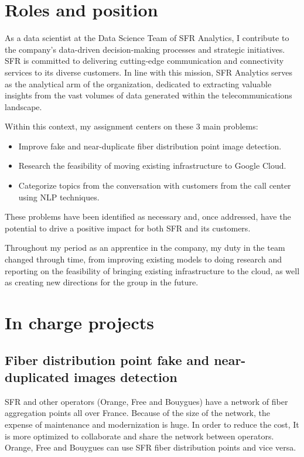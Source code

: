 \section{Roles and position}

As a data scientist at the Data Science Team of SFR Analytics, I contribute to the company's data-driven decision-making processes and strategic initiatives. SFR is committed to delivering cutting-edge communication and connectivity services to its diverse customers. In line with this mission, SFR Analytics serves as the analytical arm of the organization, dedicated to extracting valuable insights from the vast volumes of data generated within the telecommunications landscape.

Within this context, my assignment centers on these 3 main problems:

\begin{itemize}
    \item Improve fake and near-duplicate fiber distribution point image detection.
    \item Research the feasibility of moving existing infrastructure to Google Cloud.
    \item Categorize topics from the conversation with customers from the call center using NLP techniques.
\end{itemize}

These problems have been identified as necessary and, once addressed, have the potential to drive a positive impact for both SFR and its customers.

Throughout my period as an apprentice in the company, my duty in the team changed through time, from improving existing models to doing research and reporting on the feasibility of bringing existing infrastructure to the cloud, as well as creating new directions for the group in the future.


\section{In charge projects}

\subsection{Fiber distribution point fake and near-duplicated images detection}

SFR and other operators (Orange, Free and Bouygues) have a network of fiber aggregation points all over France. Because of the size of the network, the expense of maintenance and modernization is huge. In order to reduce the cost, It is more optimized to collaborate and share the network between operators. Orange, Free and Bouygues can use SFR fiber distribution points and vice versa.

